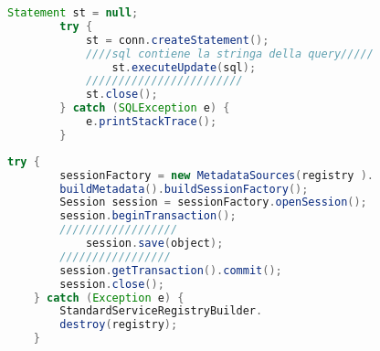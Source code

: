 \documentclass[12pt,a4paper,onecolumn,x11names]{article}
\begin{document}
\begin{minipage}[t]{.45\textwidth}
	\begin{lstlisting}[language=java,caption=Insert JDBC]
		Statement st = null;
		try {
			st = conn.createStatement();
			////sql contiene la stringa della query/////
				st.executeUpdate(sql);
			////////////////////////
			st.close();
		} catch (SQLException e) {
			e.printStackTrace();
		}
	\end{lstlisting}%
\end{minipage}%
\hfill
\begin{minipage}[t]{.45\textwidth}
	\begin{lstlisting}[language=java, caption=Insert Hibernate]
	try {
		sessionFactory = new MetadataSources(registry ).
		buildMetadata().buildSessionFactory();
		Session session = sessionFactory.openSession();
		session.beginTransaction();
		//////////////////
			session.save(object);
		/////////////////
		session.getTransaction().commit();
		session.close();
	} catch (Exception e) {
		StandardServiceRegistryBuilder.
		destroy(registry);
	}
	\end{lstlisting}%
\end{minipage}%
	
\end{document}
